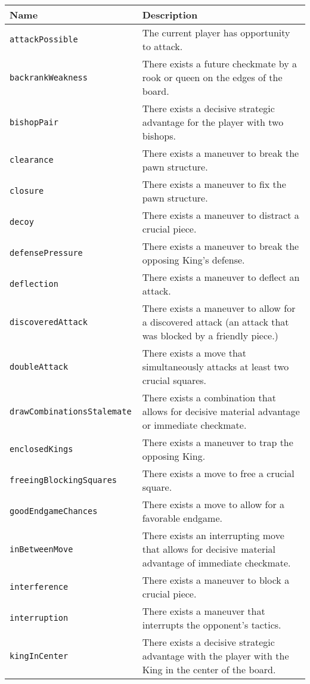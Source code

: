 \documentclass[11pt]{article}
\begin{document}
\begin{table*}
\begin{tabular}{lp{}}
\hline
\textbf{Name} & \textbf{Description} \\ \hline
\tt{attackPossible} & The current player has opportunity to attack. \\
\tt{backrankWeakness} & There exists a future checkmate by a rook or queen on the edges of the board. \\
\tt{bishopPair} & There exists a decisive strategic advantage for the player with two bishops. \\
\tt{clearance} & There exists a maneuver to break the pawn structure. \\ 
\tt{closure} & There exists a maneuver to fix the pawn structure. \\
\tt{decoy} & There exists a maneuver to distract a crucial piece. \\
\tt{defensePressure} & There exists a maneuver to break the opposing King’s defense. \\
\tt{deflection} & There exists a maneuver to deflect an attack.  \\ 
\tt{discoveredAttack} & There exists a maneuver to allow for a discovered attack (an attack that was blocked by a friendly piece.) \\
\tt{doubleAttack} & There exists a move that simultaneously attacks at least two crucial squares. \\
\tt{drawCombinationsStalemate} & There exists a combination that allows for decisive material advantage or immediate checkmate. \\
\tt{enclosedKings} & There exists a maneuver to trap the opposing King. \\
\tt{freeingBlockingSquares} & There exists a move to free a crucial square. \\
\tt{goodEndgameChances} & There exists a move to allow for a favorable endgame. \\
\tt{inBetweenMove} & There exists an interrupting move that allows for decisive material advantage of immediate checkmate. \\ 
\tt{interference} & There exists a maneuver to block a crucial piece. \\ 
\tt{interruption} & There exists a maneuver that interrupts the opponent’s tactics. \\
\tt{kingInCenter} & There exists a decisive strategic advantage with the player with the King in the center of the board. \\

\end{tabular}
\end{table*}
\end{document}
